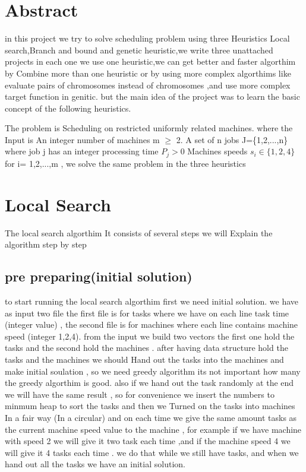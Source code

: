 \documentclass[11pt,fullpage]{article}
\begin{document}
\maketitle

\section{Abstract}

in this project we try to solve scheduling problem using three Heuristics Local search,Branch and bound and genetic heuristic,we write three unattached projects in each one we use one heuristic,we can get better  and faster algorthim by Combine more than one heuristic or by using more complex algorthims like evaluate pairs of chromosomes instead of chromosomes ,and use more complex target function in genitic. but the main idea of the project was to learn the basic concept of the following heuristics.\newline

The problem is Scheduling on restricted uniformly related machines. where the Input is An integer number of machines m $\geq$ 2. A set of n jobs J=\{1,2,...,n\} 
where job j has an integer processing time  $P_j > 0$ Machines speeds $s_i \in \{1,2,4\}$  for i= 1,2,...,m , we solve the same problem in the three heuristics
\section{Local Search}
The local search algorthim It consists of several steps we will Explain the algorithm step by step
\subsection{pre preparing(initial solution)}
to start running the local search algorthim  first we need initial solution. we have as input two file the first file is for tasks where we have on each line  task time (integer value) ,  the second file is for machines where each line contains machine speed    (integer 1,2,4). from the input we build two vectors the first one hold the tasks and the second hold the machines . after having data structure hold the tasks and the machines we should Hand out the tasks into  the machines and make initial soulation , so we need  greedy algorithm  its not important how many the greedy algorthim is good. also if we hand out the task randomly at the end we will have the same result ,  so for convenience we insert the numbers to minmum heap  to sort the tasks and then we Turned on the tasks into machines In a fair way (In a circular) and on each time  we give the same amount tasks as the current machine speed value to the machine , for example if we have machine with speed 2 we will give it two task each time ,and if the machine speed 4 we will give it 4 tasks each time . we do that while we still have tasks, and when we hand out all the tasks
we have an initial solution.
\end{document}
